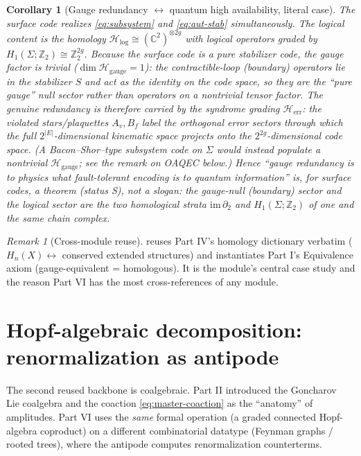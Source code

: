 \documentclass[12pt]{article}
\newtheorem{corollary}[theorem]{Corollary}
\theoremstyle{definition}
\theoremstyle{remark}
\newtheorem{remark}[theorem]{Remark}
\newcommand{\Ho}{\mathcal{H}}
\newcommand{\Hlog}{\Ho_{\mathrm{log}}}
\newcommand{\Hgauge}{\Ho_{\mathrm{gauge}}}
\newcommand{\Herr}{\Ho_{\mathrm{err}}}
\newcommand{\ZZ}{\mathbb{Z}}
\newcommand{\CC}{\mathbb{C}}
\newcommand{\Ss}{\textsf{S}}
\begin{document}
\begin{corollary}[Gauge redundancy $\leftrightarrow$ quantum high availability, literal case]
\label{cor:literal-bridge}
The surface code realizes \eqref{eq:subsystem} and \eqref{eq:aut-stab} simultaneously.
The logical content is the homology $\Hlog\cong(\CC^2)^{\otimes 2g}$ with logical
operators graded by $H_1(\Sigma;\ZZ_2)\cong\ZZ_2^{2g}$. Because the surface code is a
\emph{pure} stabilizer code, the gauge factor is trivial ($\dim\Hgauge=1$): the
contractible-loop (boundary) operators lie \emph{in} the stabilizer $S$ and act as the
identity on the code space, so they are the ``pure gauge'' null sector rather than
operators on a nontrivial tensor factor. The genuine redundancy is therefore carried by
the syndrome grading $\Herr$: the violated stars/plaquettes $A_v, B_f$ label the
orthogonal error sectors through which the full $2^{|E|}$-dimensional kinematic space
projects onto the $2^{2g}$-dimensional code space. (A Bacon--Shor--type subsystem code on
$\Sigma$ would instead populate a nontrivial $\Hgauge$; see the remark on OAQEC below.)
Hence ``gauge redundancy is to physics what fault-tolerant encoding is to quantum
information'' is, \emph{for surface codes}, a theorem (status \Ss), not a slogan: the
gauge-null (boundary) sector and the logical sector are the two homological strata
$\mathrm{im}\,\partial_2$ and $H_1(\Sigma;\ZZ_2)$ of one and the same chain complex.
\end{corollary}

\begin{remark}[Cross-module reuse]
\label{rem:crossmodule-t3}
 reuses Part IV's homology dictionary verbatim
($H_n(X)\leftrightarrow$ conserved extended structures) and instantiates Part I's
Equivalence axiom (gauge-equivalent = homologous). It is the module's central case
study and the reason Part VI has the most cross-references of any module.
\end{remark}

\section{Hopf-algebraic decomposition: renormalization as antipode}
\label{sec:hopf}

The second reused backbone is coalgebraic. Part II introduced the Goncharov~\cite{Goncharov} Lie
coalgebra and the coaction \eqref{eq:master-coaction} as the ``anatomy'' of amplitudes.
Part VI uses the \emph{same} formal operation (a graded connected Hopf-algebra
coproduct) on a different combinatorial datatype (Feynman graphs / rooted trees),
where the antipode computes renormalization counterterms.
\end{document}
